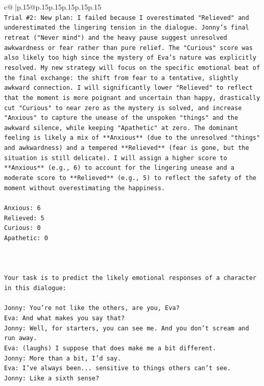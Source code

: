 \documentclass{article}
\begin{document}
{\begin{supertabular}{c@{$\;$}|p{.15\linewidth}@{}p{.15\linewidth}p{.15\linewidth}p{.15\linewidth}p{.15\linewidth}p{.15\linewidth}}
{{{\\ 
\texttt{Trial \#2: New plan: I failed because I overestimated "Relieved" and underestimated the lingering tension in the dialogue. Jonny's final retreat ("Never mind") and the heavy pause suggest unresolved awkwardness or fear rather than pure relief. The "Curious" score was also likely too high since the mystery of Eva's nature was explicitly resolved. My new strategy will focus on the specific emotional beat of the final exchange: the shift from fear to a tentative, slightly awkward connection. I will significantly lower "Relieved" to reflect that the moment is more poignant and uncertain than happy, drastically cut "Curious" to near zero as the mystery is solved, and increase "Anxious" to capture the unease of the unspoken "things" and the awkward silence, while keeping "Apathetic" at zero. The dominant feeling is likely a mix of **Anxious** (due to the unresolved "things" and awkwardness) and a tempered **Relieved** (fear is gone, but the situation is still delicate). I will assign a higher score to **Anxious** (e.g., 6) to account for the lingering unease and a moderate score to **Relieved** (e.g., 5) to reflect the safety of the moment without overestimating the happiness.} \\
\\ 
\texttt{Anxious: 6} \\
\texttt{Relieved: 5} \\
\texttt{Curious: 0} \\
\texttt{Apathetic: 0} \\
\\ 
\\ 
\\ 
\texttt{Your task is to predict the likely emotional responses of a character in this dialogue:} \\
\\ 
\texttt{Jonny: You're not like the others, are you, Eva?} \\
\texttt{Eva: And what makes you say that?} \\
\texttt{Jonny: Well, for starters, you can see me. And you don't scream and run away.} \\
\texttt{Eva: (laughs) I suppose that does make me a bit different.} \\
\texttt{Jonny: More than a bit, I'd say. } \\
\texttt{Eva: I've always been... sensitive to things others can't see. } \\
\texttt{Jonny: Like a sixth sense?} \\
}}}
\end{supertabular}}
\end{document}
